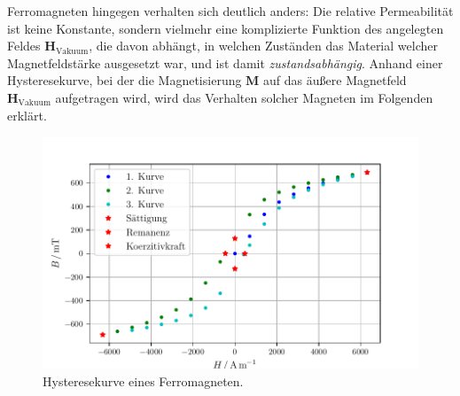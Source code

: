 Ferromagneten 
hingegen verhalten sich deutlich anders:
Die relative Permeabilität ist keine Konstante, sondern vielmehr 
eine komplizierte Funktion des angelegten Feldes $\symbf{H}_\text{Vakuum}$, die %
davon abhängt, in welchen Zuständen das Material welcher Magnetfeldstärke ausgesetzt war, und ist damit \textit{zustandsabhängig}. %
Anhand einer Hysteresekurve, bei der die Magnetisierung $\symbf{M}$ auf das äußere Magnetfeld $\symbf{H}_\text{Vakuum}$ 
aufgetragen wird, wird das Verhalten solcher Magneten im Folgenden erklärt. 
\FloatBarrier
\begin{figure}
    \centering
    \includegraphics{plot_Hysterese.pdf}
    \caption{Hysteresekurve eines Ferromagneten.}
    \label{fig:hysterese}
\end{figure}
\FloatBarrier

